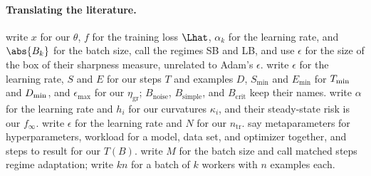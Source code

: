 \begin{refsection}
\paragraph{Translating the literature.} \Textcite{KeskarEtAl2017} write $x$ for our $\theta$, $f$ for the training loss $\Lhat$, $\alpha_k$ for the learning rate, and $\abs{B_k}$ for the batch size, call the regimes SB and LB, and use $\epsilon$ for the size of the box of their sharpness measure, unrelated to Adam's $\epsilon$. \Textcite{McCandlishEtAl2018} write $\epsilon$ for the learning rate, $S$ and $E$ for our steps $T$ and examples $D$, $S_{\min}$ and $E_{\min}$ for $T_{\min}$ and $D_{\min}$, and $\epsilon_{\max}$ for our $\eta_{\mathrm{gr}}$; $B_{\mathrm{noise}}$, $B_{\mathrm{simple}}$, and $B_{\mathrm{crit}}$ keep their names. \Textcite{ZhangEtAl2019} write $\alpha$ for the learning rate and $h_i$ for our curvatures $\kappa_i$, and their steady-state risk is our $f_\infty$. \Textcite{SmithLe2018} write $\epsilon$ for the learning rate and $N$ for our $n_{\mathrm{tr}}$. \Textcite{ShallueEtAl2019} say metaparameters for hyperparameters, workload for a model, data set, and optimizer together, and steps to result for our $T(B)$. \Textcite{HofferEtAl2017} write $M$ for the batch size and call matched steps regime adaptation; \textcite{GoyalEtAl2017} write $kn$ for a batch of $k$ workers with $n$ examples each.

\printchapterbib
\end{refsection}
